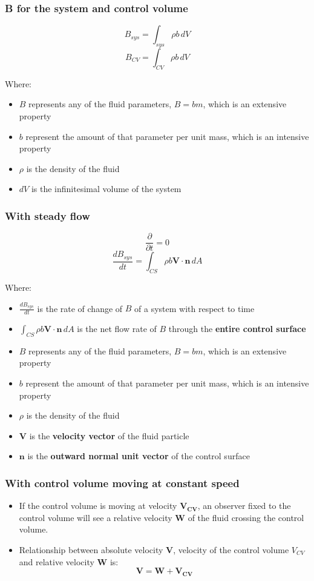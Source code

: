 \documentclass[11pt]{article}
\begin{document}
\subsubsection{B for the system and control volume}
\label{sec:org1cc861b}
\[B_{sys} = \int_{sys} \rho b \, dV\]
\[B_{CV} = \int_{CV} \rho b \, dV\]

Where:
\begin{itemize}
\item \(B\) represents any of the fluid parameters, \(B = bm\), which is an extensive property
\item \(b\) represent the amount of that parameter per unit mass, which is an intensive property
\item \(\rho\) is the density of the fluid
\item \(dV\) is the infinitesimal volume of the system
\end{itemize}

\subsubsection{With steady flow}
\label{sec:orgffa4975}
\[\frac{\partial}{\partial t} = 0\]
\[\frac{dB_{sys}}{dt} = \int_{CS} \rho b \boldsymbol{V} \cdot \boldsymbol{n} \, dA\]

Where:
\begin{itemize}
\item \(\frac{dB_{sys}}{dt}\) is the rate of change of \(B\) of a system with respect to time
\item \(\int_{CS} \rho b \boldsymbol{V} \cdot \boldsymbol{n} \, dA\) is the net flow rate of \(B\) through the \textbf{entire control surface}
\item \(B\) represents any of the fluid parameters, \(B = bm\), which is an extensive property
\item \(b\) represent the amount of that parameter per unit mass, which is an intensive property
\item \(\rho\) is the density of the fluid
\item \(\boldsymbol{V}\) is the \textbf{velocity vector} of the fluid particle
\item \(\boldsymbol{n}\) is the \textbf{outward normal unit vector} of the control surface
\end{itemize}

\newpage

\subsubsection{With control volume moving at constant speed}
\label{sec:org04d51c6}
\begin{itemize}
\item If the control volume is moving at velocity \(\boldsymbol{V_{CV}}\), an observer fixed to the control volume will see a relative velocity \(\boldsymbol{W}\) of the fluid crossing the control volume.
\item Relationship between absolute velocity \(\boldsymbol{V}\), velocity of the control volume \(V_{CV}\) and relative velocity \(\boldsymbol{W}\) is:
\[\boldsymbol{V} = \boldsymbol{W} + \boldsymbol{V_{CV}}\]
\end{itemize}
\end{document}
